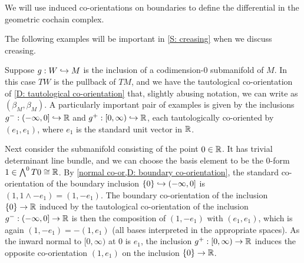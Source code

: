 We will use induced co-orientations on boundaries to define the differential in the geometric cochain complex.


The following examples will be important in \cref{S: creasing} when we discuss creasing.

\begin{example}\label{E: splitting example 1}
Suppose $g:W\hookrightarrow M$ is the inclusion of a codimension-$0$ submanifold of $M$. In this case $TW$ is the pullback of $TM$, and we have the tautological co-orientation of \cref{D: tautological co-orientation} that, slightly abusing notation, we can write as $(\beta_M,\beta_M)$.  A particularly important pair of examples is given by the inclusions  $g^-:(-\infty, 0]\hookrightarrow \mathbb{R}$ and  $g^+:[0,\infty)\hookrightarrow \mathbb{R}$, each tautologically co-oriented by $(e_1,e_1)$, where $e_1$ is the standard unit vector in $\mathbb{R}$.

Next consider the submanifold consisting of the point $0\in \mathbb{R}$. It has trivial determinant line bundle, and we can choose the basis element to be the $0$-form $1\in \bigwedge^0 T0\cong \mathbb{R}$. By \cref{normal co-or,D: boundary co-orientation}, the standard co-orientation of the boundary inclusion $\{0\}\hookrightarrow  (-\infty, 0]$ is $(1,1\wedge -e_1)=(1,-e_1)$. The boundary co-orientation of the inclusion $\{0\}\to \mathbb{R}$ induced by the tautological co-orientation of the inclusion $g^-:(-\infty, 0]\to \mathbb{R}$ is then the composition of $(1,-e_1)$ with $(e_1,e_1)$, which is again $(1,-e_1)=-(1,e_1)$ (all bases interpreted in the appropriate spaces). As the inward normal to $[0,\infty)$ at $0$ is $e_1$, the inclusion $g^+:[0,\infty)\to \mathbb{R}$ induces the opposite co-orientation $(1,e_1)$ on  the inclusion $\{0\}\to \mathbb{R}$.
\end{example}

